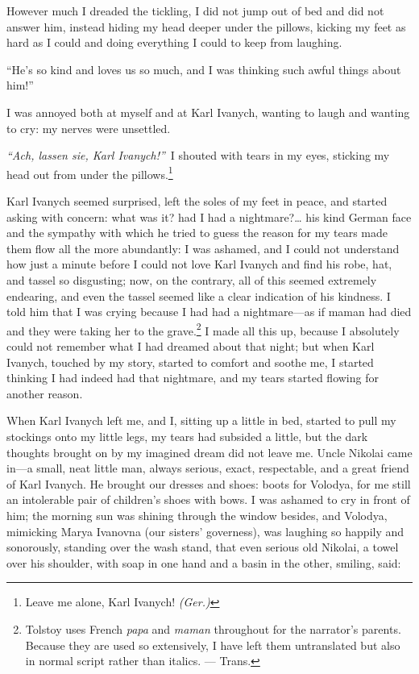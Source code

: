 However much I dreaded the tickling, I did not jump out of bed and did not answer him, instead hiding my head deeper under the pillows, kicking my feet as hard as I could and doing everything I could to keep from laughing.

``He's so kind and loves us so much, and I was thinking such awful things about him!'' %

I was annoyed both at myself and at Karl Ivanych, wanting to laugh and wanting to cry: my nerves were unsettled.

\textit{``Ach, lassen sie, Karl Ivanych!''}~I shouted with tears in my eyes, sticking my head out from under the pillows.\footnote{Leave me alone, Karl Ivanych! \textit{(Ger.)}} %

Karl Ivanych seemed surprised, left the soles of my feet in peace, and started asking with concern: what was it? had I had a nightmare?\ldots{} his kind German face and the sympathy with which he tried to guess the reason for my tears made them flow all the more abundantly: I was ashamed, and I could not understand how just a minute before I could not love Karl Ivanych and find his robe, hat, and tassel so disgusting; now, on the contrary, all of this seemed extremely endearing, and even the tassel seemed like a clear indication of his kindness. I told him that I was crying because I had had a nightmare---as if maman had died and they were taking her to the grave.\footnote{Tolstoy uses French \textit{papa} and \textit{maman} throughout for the narrator's parents. Because they are used so extensively, I have left them untranslated but also in normal script rather than italics. --- Trans.} I made all this up, because I absolutely could not remember what I had dreamed about that night; but when Karl Ivanych, touched by my story, started to comfort and soothe me, I started thinking I had indeed had that nightmare, and my tears started flowing for another reason. 

When Karl Ivanych left me, and I, sitting up a little in bed, started to pull my stockings  onto my little legs, my tears had subsided a little, but the dark thoughts brought on by my imagined dream did not leave me. Uncle  Nikolai came in---a small, neat little man, always serious, exact, respectable,  and a great friend of Karl Ivanych. He brought our dresses and shoes: boots for Volodya, for me still an intolerable pair of children's shoes with bows.  I was ashamed to cry in front of him; the morning sun was shining through the window besides, and Volodya, mimicking Marya Ivanovna (our sisters' governess), was laughing so happily and sonorously, standing over the wash stand, that even serious old Nikolai, a towel over his shoulder, with soap in one hand and a basin in the other, smiling, said:


